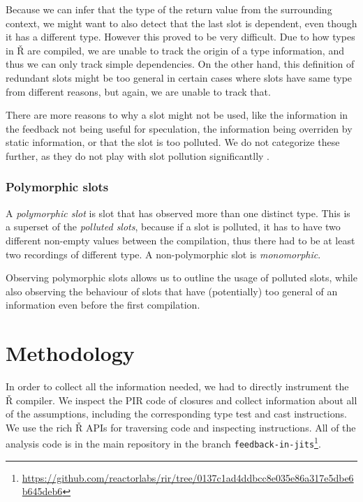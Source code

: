 Because we can infer that the type of the return value from the surrounding context, we might want to also detect that the last slot is dependent, even though it has a different type. However this proved to be very difficult. Due to how types in Ř are compiled, we are unable to track the origin of a type information, and thus we can only track simple dependencies. On the other hand, this definition of redundant slots might be too general in certain cases where slots have same type from different reasons, but again, we are unable to track that. 

There are more reasons to why a slot might not be used, like the information in the feedback not being useful for speculation, the information being overriden by static information, or that the slot is too polluted. We do not categorize these further, as they do not play with slot pollution significantlly .

\subsubsection*{Polymorphic slots}

A \textit{polymorphic slot} is slot that has observed more than one distinct type. This is a superset of the \textit{polluted slots}, because if a slot is polluted, it has to have two different non-empty values between the compilation, thus there had to be at least two recordings of different type. A non-polymorphic slot is \textit{monomorphic}.

Observing polymorphic slots allows us to outline the usage of polluted slots, while also observing the behaviour of slots that have (potentially) too general of an information even before the first compilation.

\section{Methodology}

In order to collect all the information needed, we had to directly instrument the Ř compiler. We inspect the PIR code of closures and collect information about all of the assumptions, including the corresponding type test and cast instructions. We use the rich Ř APIs for traversing code and inspecting instructions. All of the analysis code is in the main repository in the branch \texttt{feedback-in-jits}\footnote{\url{https://github.com/reactorlabs/rir/tree/0137c1ad4ddbcc8e035e86a317e5dbe6b645deb6}}.

